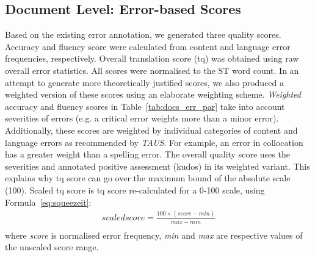 \subsection{\label{ssec:doc_err_res}Document Level: Error-based Scores}
Based on the existing error annotation, we generated three quality scores. Accuracy and fluency score were calculated from content and language error frequencies, respectively. Overall translation score (tq) was obtained using raw overall error statistics. All scores were normalised to the ST word count.
In an attempt to generate more theoretically justified scores, we also produced a weighted version of these scores using an elaborate weighting scheme. \textit{Weighted} accuracy and fluency scores in Table~\ref{tab:docs_err_par} take into account severities of errors (e.g. a critical error weights more than a minor error). Additionally, these scores are weighted by individual categories of content and language errors as recommended by \textit{TAUS}. For example, an error in collocation has a greater weight than a spelling error. 
The overall quality score uses the severities and annotated positive assessment (kudos) in its weighted variant. This explains why tq score can go over the maximum bound of the absolute scale (100). Scaled tq score is tq score re-calculated for a 0-100 scale, using Formula~\ref{eq:squeezeit}:
\begin{equation}\label{eq:squeezeit}
\begin{split}
scaled score = \frac{100\times (score - min)}{max - min} \\
\end{split}
\end{equation}
where \textit{score} is normalised error frequency, \textit{min} and \textit{max} are respective values of the unscaled score range.

